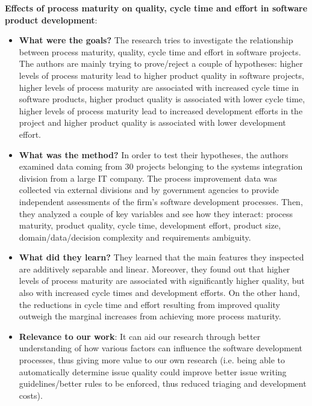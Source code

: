 \documentclass{mprop}
\begin{document}
\textbf{Effects of process maturity on quality, cycle time and effort in software product development}\cite{harter2000effects}:
\begin{itemize}
  \item \textbf{What were the goals?}
  The research tries to investigate the relationship between process maturity, quality, cycle time and effort in software projects. The authors are mainly trying to prove/reject a couple of hypotheses: higher levels of process maturity lead to higher product quality in software projects, higher levels of process maturity are associated with increased cycle time in software products, higher product quality is associated with lower cycle time, higher levels of process maturity lead to increased development efforts in the project and higher product quality is associated with lower development effort.
  \item \textbf{What was the method?}
  In order to test their hypotheses, the authors examined data coming from 30 projects belonging to the systems integration division from a large IT company. The process improvement data was collected via external divisions and by government agencies to provide independent assessments of the firm’s software development processes. Then, they analyzed a couple of key variables and see how they interact: process maturity, product quality, cycle time, development effort, product size, domain/data/decision complexity and requirements ambiguity.
  \item \textbf{What did they learn?}
  They learned that the main features they inspected are additively separable and linear. Moreover, they found out that higher levels of process maturity are associated with significantly higher quality, but also with increased cycle times and development efforts. On the other hand, the reductions in cycle time and effort resulting from improved quality outweigh the marginal increases from achieving more process maturity.
  \item \textbf{Relevance to our work}:
  It can aid our research through better understanding of how various factors can influence the software development processes, thus giving more value to our own research (i.e. being able to automatically determine issue quality could improve better issue writing guidelines/better rules to be enforced, thus reduced triaging and development costs). 
\end{itemize}
\end{document}
